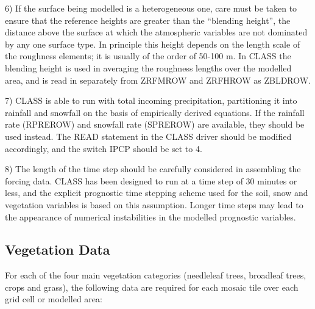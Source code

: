6) If the surface being modelled is a heterogeneous one, care must be taken to ensure that the reference heights are greater than the “blending height”, the distance above the surface at which the atmospheric variables are not dominated by any one surface type. In principle this height depends on the length scale of the roughness elements; it is usually of the order of 50-\/100 m. In C\+L\+A\+S\+S the blending height is used in averaging the roughness lengths over the modelled area, and is read in separately from Z\+R\+F\+M\+R\+O\+W and Z\+R\+F\+H\+R\+O\+W as Z\+B\+L\+D\+R\+O\+W.

7) C\+L\+A\+S\+S is able to run with total incoming precipitation, partitioning it into rainfall and snowfall on the basis of empirically derived equations. If the rainfall rate (R\+P\+R\+E\+R\+O\+W) and snowfall rate (S\+P\+R\+E\+R\+O\+W) are available, they should be used instead. The R\+E\+A\+D statement in the C\+L\+A\+S\+S driver should be modified accordingly, and the switch I\+P\+C\+P should be set to 4.

8) The length of the time step should be carefully considered in assembling the forcing data. C\+L\+A\+S\+S has been designed to run at a time step of 30 minutes or less, and the explicit prognostic time stepping scheme used for the soil, snow and vegetation variables is based on this assumption. Longer time steps may lead to the appearance of numerical instabilities in the modelled prognostic variables.\hypertarget{index_vegetationData}{}\subsection{Vegetation Data}\label{index_vegetationData}
For each of the four main vegetation categories (needleleaf trees, broadleaf trees, crops and grass), the following data are required for each mosaic tile over each grid cell or modelled area\+:


